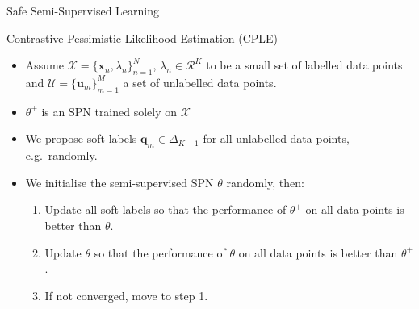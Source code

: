 \begin{frame}{Safe Semi-Supervised Learning}{}
    \begin{block}{Contrastive Pessimistic Likelihood Estimation (CPLE)}
\begin{itemize}
    \item Assume $\mathcal{X} = \{\bm x_n, \lambda_n\}_{n=1}^N$, $\lambda_n \in \mathcal{R}^K$ to be a small set of labelled data points and $\mathcal{U} = \{\bm u_m\}_{m=1}^M$ a set of unlabelled data points.
    \item $\theta^+$ is an SPN trained solely on $\mathcal{X}$
    \item We propose soft labels $\bm q_m \in \Delta_{K-1}$ for all unlabelled data points, e.g.~randomly.
    \item We initialise the semi-supervised SPN $\theta$ randomly, then:
    \pause
    \begin{enumerate}
        \item Update all soft labels so that the performance of $\theta^+$ on all data points is better than $\theta$.
        \item Update $\theta$ so that the performance of $\theta$ on all data points is better than $\theta^+$.
        \item If not converged, move to step 1.
    \end{enumerate}
\end{itemize}

\end{block}
\end{frame}


